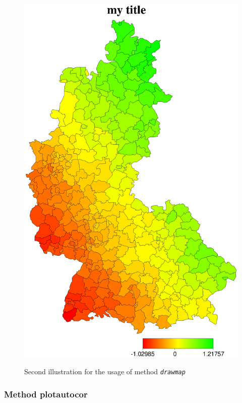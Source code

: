 \begin{figure}[ht]
\begin{center}
\includegraphics[scale=0.4]{grafiken/drawmapexample2.ps}
{\em\caption{ \label{drawmapexample2} Second illustration for the
usage of method \em \texttt{drawmap}}}
\end{center}
\end{figure}



\subsubsection{Method plotautocor}
\label{bayesregplotautocor} 

